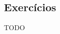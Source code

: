 \documentclass[
]{article}
\theoremstyle{definition}
\theoremstyle{definition}
\theoremstyle{definition}
\theoremstyle{definition}
\theoremstyle{remark}
\begin{document}
\newpage

\hypertarget{exercuxedcios-1}{%
\subsection{Exercícios}\label{exercuxedcios-1}}

TODO
\end{document}

